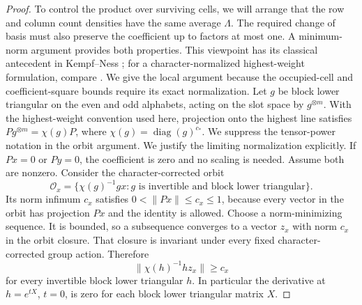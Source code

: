 \begin{proof}
To control the product over surviving cells, we will arrange that
the row and column count densities have the same average
$\Lambda$.  The required change of basis must also preserve the
coefficient up to factors at most one.  A minimum-norm argument
provides both properties.  This viewpoint has its classical
antecedent in Kempf--Ness \cite[Theorem~0.1]{KempfNess1979};
for a character-normalized highest-weight formulation, compare
\citet[Sections~2 and~4]{FranksWalter2022}. We give the local argument because the occupied-cell and coefficient-square bounds require its exact normalization.  Let $g$ be
block lower triangular on the even and odd alphabets, acting on
the slot space by $g^{\otimes m}$.  With the highest-weight
convention used here, projection onto the highest line satisfies
$Pg^{\otimes m}=\chi(g)P$, where
$\chi(g)=\operatorname{diag}(g)^{c_*}$.  We suppress the tensor-power
notation in the orbit argument.
We justify the limiting normalization explicitly. If $Px=0$ or $Py=0$, the coefficient is zero and no scaling is needed. Assume both are nonzero. Consider the character-corrected orbit
\[
 \mathcal O_x=\{\chi(g)^{-1}g x:g\text{ is invertible and block lower triangular}\}.
\]
Its norm infimum $c_x$ satisfies $0<\|Px\|\le c_x\le1$, because every vector in the orbit has projection $Px$ and the identity is allowed. Choose a norm-minimizing sequence. It is bounded, so a subsequence converges to a vector $z_x$ with norm $c_x$ in the orbit closure. That closure is invariant under every fixed character-corrected group action. Therefore
\[
 \|\chi(h)^{-1}h z_x\|\ge c_x
\]
for every invertible block lower triangular $h$. In particular the derivative at $h=e^{tX}$, $t=0$, is zero for each block lower triangular matrix $X$.


\end{proof}
